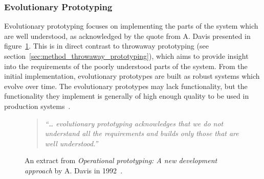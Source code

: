 
\subsubsection{Evolutionary Prototyping}
\label{sec:method_evolutionary_prototyping}

Evolutionary prototyping focuses on implementing the parts of the system which are well understood, as acknowledged by the quote from A. Davis presented in figure~\ref{fig:evolutionary_prototyping}. This is in direct contrast to throwaway prototyping (see section~\ref{sec:method_throwaway_prototyping}), which aims to provide insight into the requirements of the poorly understood parts of the system. From the initial implementation, evolutionary prototypes are built as robust systems which evolve over time. The evolutionary prototypes may lack functionality, but the functionality they implement is generally of high enough quality to be used in production systems~\cite{operational_prototyping}.

\begin{figure}[htbp]
	\begin{quote}
		\textit{``… evolutionary prototyping acknowledges that we do not understand all the requirements and builds only those that are well understood.''}
	\end{quote}
	\caption{An extract from \textit{Operational prototyping: A new development approach} by A. Davis in 1992~\cite{operational_prototyping}.}
	\label{fig:evolutionary_prototyping}
\end{figure}
